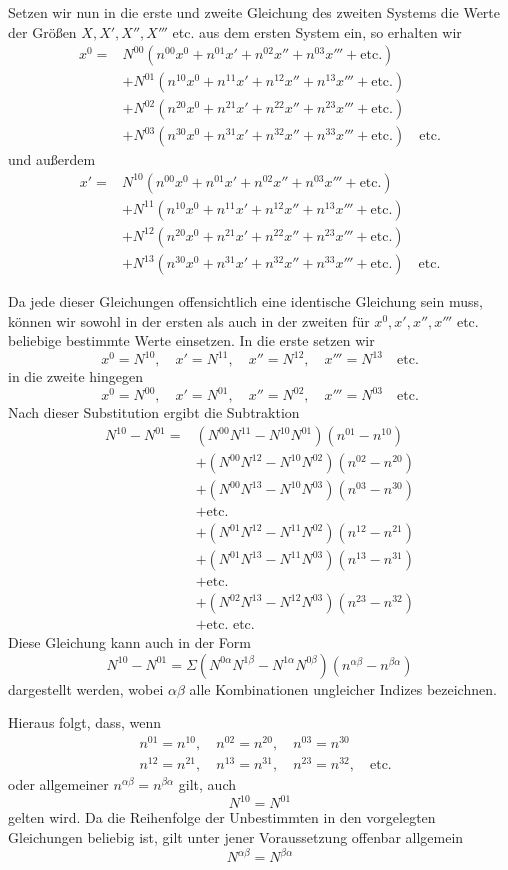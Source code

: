 Setzen wir nun in die erste und zweite Gleichung des zweiten Systems die Werte der Größen \(X,X',X'',X'''\) etc. aus dem ersten System ein, so erhalten wir
\[
\begin{aligned}
x^0={}&N^{00}(n^{00}x^0+n^{01}x'+n^{02}x''+n^{03}x'''+\text{etc.})\\
&+N^{01}(n^{10}x^0+n^{11}x'+n^{12}x''+n^{13}x'''+\text{etc.})\\
&+N^{02}(n^{20}x^0+n^{21}x'+n^{22}x''+n^{23}x'''+\text{etc.})\\
&+N^{03}(n^{30}x^0+n^{31}x'+n^{32}x''+n^{33}x'''+\text{etc.})\quad\text{etc.}
\end{aligned}
\]
und außerdem
\[
\begin{aligned}
x'={}&N^{10}(n^{00}x^0+n^{01}x'+n^{02}x''+n^{03}x'''+\text{etc.})\\
&+N^{11}(n^{10}x^0+n^{11}x'+n^{12}x''+n^{13}x'''+\text{etc.})\\
&+N^{12}(n^{20}x^0+n^{21}x'+n^{22}x''+n^{23}x'''+\text{etc.})\\
&+N^{13}(n^{30}x^0+n^{31}x'+n^{32}x''+n^{33}x'''+\text{etc.})\quad\text{etc.}
\end{aligned}
\]

Da jede dieser Gleichungen offensichtlich eine identische Gleichung sein muss, können wir sowohl in der ersten als auch in der zweiten für \(x^0,x',x'',x'''\) etc. beliebige bestimmte Werte einsetzen. In die erste setzen wir
\[
x^0=N^{10},\quad x'=N^{11},\quad x''=N^{12},\quad x'''=N^{13}\quad\text{etc.}
\]
in die zweite hingegen
\[
x^0=N^{00},\quad x'=N^{01},\quad x''=N^{02},\quad x'''=N^{03}\quad\text{etc.}
\]
Nach dieser Substitution ergibt die Subtraktion
\[
\begin{aligned}
N^{10}-N^{01}={}&(N^{00}N^{11}-N^{10}N^{01})(n^{01}-n^{10})\\
&+(N^{00}N^{12}-N^{10}N^{02})(n^{02}-n^{20})\\
&+(N^{00}N^{13}-N^{10}N^{03})(n^{03}-n^{30})\\
&+\text{etc.}\\
&+(N^{01}N^{12}-N^{11}N^{02})(n^{12}-n^{21})\\
&+(N^{01}N^{13}-N^{11}N^{03})(n^{13}-n^{31})\\
&+\text{etc.}\\
&+(N^{02}N^{13}-N^{12}N^{03})(n^{23}-n^{32})\\
&+\text{etc. etc.}
\end{aligned}
\]
Diese Gleichung kann auch in der Form
\[
N^{10}-N^{01}=\Sigma(N^{0\alpha}N^{1\beta}-N^{1\alpha}N^{0\beta})(n^{\alpha\beta}-n^{\beta\alpha})
\]
dargestellt werden, wobei \(\alpha\beta\) alle Kombinationen ungleicher Indizes bezeichnen.

Hieraus folgt, dass, wenn
\[
\begin{aligned}
&n^{01}=n^{10},\quad n^{02}=n^{20},\quad n^{03}=n^{30}\\
&n^{12}=n^{21},\quad n^{13}=n^{31},\quad n^{23}=n^{32},\quad\text{etc.}
\end{aligned}
\]
oder allgemeiner \(n^{\alpha\beta}=n^{\beta\alpha}\) gilt, auch
\[
N^{10}=N^{01}
\]
gelten wird. Da die Reihenfolge der Unbestimmten in den vorgelegten Gleichungen beliebig ist, gilt unter jener Voraussetzung offenbar allgemein
\[
N^{\alpha\beta}=N^{\beta\alpha}
\]
